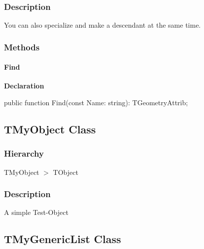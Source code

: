 \documentclass{report}
\begin{document}
\subsubsection*{\large{\textbf{Description}}\normalsize\hspace{1ex}\hfill}
You can also specialize and make a descendant at the same time.\subsubsection*{\large{\textbf{Methods}}\normalsize\hspace{1ex}\hfill}
\paragraph*{Find}\hspace*{\fill}

\begin{list}{}{
\setlength{\itemindent}{0cm}
\setlength{\listparindent}{0cm}
\setlength{\leftmargin}{\evensidemargin}
\addtolength{\leftmargin}{\tmplength}
\settowidth{\labelsep}{X}
\addtolength{\leftmargin}{\labelsep}
\setlength{\labelwidth}{\tmplength}
}
\begin{flushleft}
\item[\textbf{Declaration}\hfill]
\begin{ttfamily}
public function Find(const Name: string): TGeometryAttrib;\end{ttfamily}


\end{flushleft}
\end{list}
\subsection*{TMyObject Class}
\subsubsection*{\large{\textbf{Hierarchy}}\normalsize\hspace{1ex}\hfill}
TMyObject {$>$} TObject
\subsubsection*{\large{\textbf{Description}}\normalsize\hspace{1ex}\hfill}
A simple Test{-}Object\subsection*{TMyGenericList Class}
\end{document}
